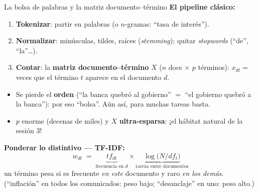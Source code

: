 \documentclass{beamer}
\newcommand{\1}{\mathbb{I}}
\begin{document}
\begin{frame}{La bolsa de palabras y la matriz documento--término}
\small
\textbf{El pipeline clásico:}
\begin{enumerate}\itemsep3pt
  \item \textbf{Tokenizar}: partir en palabras (o $n$-gramas: ``tasa de interés'').
  \item \textbf{Normalizar}: minúsculas, tildes, raíces (\emph{stemming}); quitar \emph{stopwords} (``de'', ``la''\ldots).
  \item \textbf{Contar}: la \textbf{matriz documento--término} $X$ ($n$ docs $\times$ $p$ términos): $x_{dt} = $ veces que el término $t$ aparece en el documento $d$.
\end{enumerate}
\pause

\begin{itemize}\itemsep4pt
  \item Se pierde el \textbf{orden} (``la banca quebró al gobierno'' $=$ ``el gobierno quebró a la banca''): por eso ``bolsa''. Aún así, para muchas tareas basta.
  \item $p$ enorme (decenas de miles) y $X$ \textbf{ultra-esparsa}: ¡el hábitat natural de la sesión 3! \pause
\end{itemize}

\vspace{0.1cm}
\textbf{Ponderar lo distintivo --- TF-IDF:}
\[ w_{dt} \;=\; \underbrace{tf_{dt}}_{\text{frecuencia en } d} \times \underbrace{\log\big( N / df_t \big)}_{\text{rareza entre documentos}} \]
un término pesa si es frecuente \emph{en este} documento y raro \emph{en los demás}. (``inflación'' en todos los comunicados: peso bajo; ``desanclaje'' en uno: peso alto.)
\end{frame}
\end{document}
